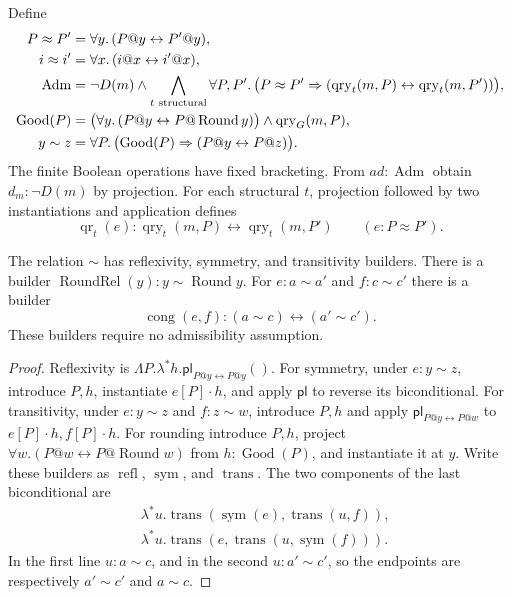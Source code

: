 \begin{definition}
\label{rel-admissible}
Define
\[
\begin{aligned}
 P\approx P'&=\forall y.\,(P@y\leftrightarrow P'@y),\\
 i\approx i'&=\forall x.\,(i@x\leftrightarrow i'@x),\\
 \operatorname{Adm}
   &=\neg D(m)\land
       \bigwedge_{t\ {\rm structural}}\forall P,P'.\,
       \bigl(P\approx P'\Rightarrow
          (\operatorname{qry}_t(m,P)\leftrightarrow
           \operatorname{qry}_t(m,P'))\bigr),\\
 \operatorname{Good}(P)
   &=\bigl(\forall y.\,(P@y\leftrightarrow
                     P@\operatorname{Round}y)\bigr)
           \land\operatorname{qry}_G(m,P),\\
 y\sim z&=\forall P.\,
       \bigl(\operatorname{Good}(P)\Rightarrow
                      (P@y\leftrightarrow P@z)\bigr).
\end{aligned}
\]
The finite Boolean operations have fixed bracketing.  From
\(ad:\operatorname{Adm}\) obtain \(d_m:\neg D(m)\) by projection.
For each structural \(t\), projection followed by two instantiations
and application defines
\[
 \operatorname{qr}_t(e):
 \operatorname{qry}_t(m,P)\leftrightarrow
 \operatorname{qry}_t(m,P')
 \qquad(e:P\approx P').
\]
\end{definition}

\begin{lemma}
\label{rel-equivalence}
The relation \(\sim\) has reflexivity, symmetry, and transitivity
builders.  There is a builder
\(\operatorname{RoundRel}(y):y\sim\operatorname{Round}y\).
For \(e:a\sim a'\) and \(f:c\sim c'\) there is a builder
\[
 \operatorname{cong}(e,f):
       (a\sim c)\leftrightarrow(a'\sim c').
\]
These builders require no admissibility assumption.
\end{lemma}
\begin{proof}
Reflexivity is
\(\Lambda P.\lambda^*h.\mathsf{pl}_{P@y\leftrightarrow P@y}()\).
For symmetry, under \(e:y\sim z\), introduce \(P,h\), instantiate
\(e[P]\cdot h\), and apply \(\mathsf{pl}\) to reverse its
biconditional.  For transitivity, under
\(e:y\sim z\) and \(f:z\sim w\), introduce \(P,h\) and apply
\(\mathsf{pl}_{P@y\leftrightarrow P@w}\) to
\(e[P]\cdot h,f[P]\cdot h\).
For rounding introduce \(P,h\), project
\(\forall w.(P@w\leftrightarrow P@\operatorname{Round}w)\)
from \(h:\operatorname{Good}(P)\), and instantiate it at \(y\).
Write these builders as \(\operatorname{refl}\),
\(\operatorname{sym}\), and \(\operatorname{trans}\).
The two components of the last biconditional are
\[
\begin{aligned}
 &\lambda^*u.\operatorname{trans}
       (\operatorname{sym}(e),\operatorname{trans}(u,f)),\\
 &\lambda^*u.\operatorname{trans}
       (e,\operatorname{trans}(u,\operatorname{sym}(f))).
\end{aligned}
\]
In the first line \(u:a\sim c\), and in the second
\(u:a'\sim c'\), so the endpoints are respectively
\(a'\sim c'\) and \(a\sim c\).
\end{proof}

